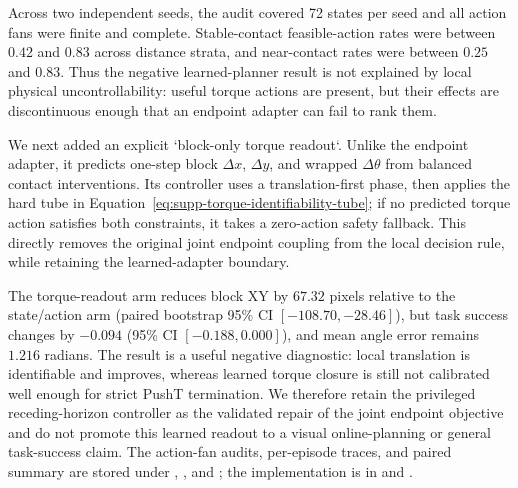 \documentclass{article}
\begin{document}
Across two independent seeds, the audit covered 72 states per seed and all
action fans were finite and complete.  Stable-contact feasible-action rates
were between $0.42$ and $0.83$ across distance strata, and near-contact rates
were between $0.25$ and $0.83$.  Thus the negative learned-planner result is
not explained by local physical uncontrollability: useful torque actions are
present, but their effects are discontinuous enough that an endpoint adapter
can fail to rank them.

We next added an explicit `block-only torque readout`.  Unlike the endpoint
adapter, it predicts one-step block $\Delta x$, $\Delta y$, and wrapped
$\Delta\theta$ from balanced contact interventions.  Its controller uses a
translation-first phase, then applies the hard tube in
Equation~\ref{eq:supp-torque-identifiability-tube}; if no predicted torque
action satisfies both constraints, it takes a zero-action safety fallback.
This directly removes the original joint endpoint coupling from the local
decision rule, while retaining the learned-adapter boundary.

\begin{table}[H]
\centering
\scriptsize
\setlength{\tabcolsep}{3pt}
\caption{Matched learned torque-effect readout over two seeds and 32 paired
held-out cases. The new arm improves local block translation but does not
close the learned orientation/task endpoint.}
\label{tab:supp-torque-effect-readout}
\end{table}

The torque-readout arm reduces block XY by $67.32$ pixels relative to the
state/action arm (paired bootstrap 95\% CI $[-108.70,-28.46]$), but task
success changes by $-0.094$ (95\% CI $[-0.188,0.000]$), and mean angle error
remains $1.216$ radians.  The result is a useful negative diagnostic: local
translation is identifiable and improves, whereas learned torque closure is
still not calibrated well enough for strict PushT termination.  We therefore
retain the privileged receding-horizon controller as the validated repair of
the joint endpoint objective and do not promote this learned readout to a
visual online-planning or general task-success claim.  The action-fan audits,
per-episode traces, and paired summary are stored under
,
, and
; the
implementation is in
 and
.
\end{document}
